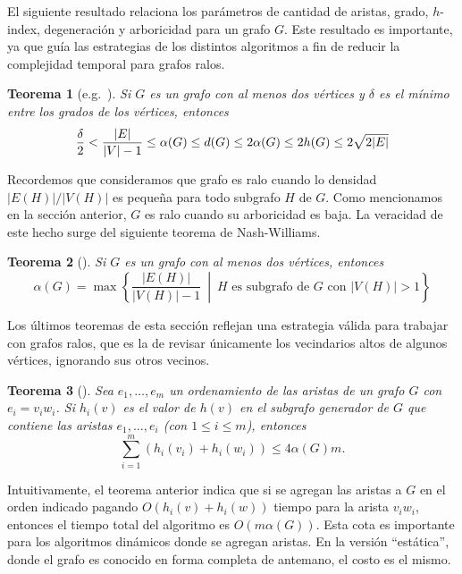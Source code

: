 \documentclass[%
    a4paper,%
    fontsize=12pt,%
    DIV=12,
    twoside,%
    openright,%
    titlepage=true,%
    headsepline,%
    toc=bibliography,%
    parskip=half,%
    cleardoublepage=empty,%
    headings=big,%
]{scrbook}
\newtheorem{theorem}{Teorema}
\begin{document}
El siguiente resultado relaciona los parámetros de cantidad de aristas, grado, $h$-index, degeneración y arboricidad para un grafo $G$.  Este resultado es importante, ya que guía las estrategias de los distintos algoritmos a fin de reducir la complejidad temporal para grafos ralos.

\begin{theorem}[e.g.~\cite{ChibaNishizekiSJC1985,LinSoulignacSzwarcfiterTCS2012}]
 Si $G$ es un grafo con al menos dos vértices y $\delta$ es el mínimo entre los grados de los vértices, entonces
 \begin{displaymath}
   \frac{\delta}{2} < \frac{|E|}{|V|-1} \leq \alpha(G) \leq d(G) \leq 2\alpha(G) \leq 2h(G) \leq 2\sqrt{2|E|} \\
 \end{displaymath}
\end{theorem}

Recordemos que consideramos que grafo es ralo cuando lo densidad $|E(H)|/|V(H)|$ es pequeña para todo subgrafo $H$ de $G$.  Como mencionamos en la sección anterior, $G$ es ralo cuando su arboricidad es baja.  La veracidad de este hecho surge del siguiente teorema de Nash-Williams.

\begin{theorem}[\cite{Nash-WilliamsJLMS1964}]
  Si $G$ es un grafo con al menos dos vértices, entonces
  \[\alpha(G) = \max\left\{\frac{|E(H)|}{|V(H)|-1} \ \middle| \ H \text{ es subgrafo de }G \text{ con } |V(H)| > 1\right\}\]
\end{theorem}

Los últimos teoremas de esta sección reflejan una estrategia válida para trabajar con grafos ralos, que es la de revisar únicamente los vecindarios altos de algunos vértices, ignorando sus otros vecinos.

\begin{theorem}[\cite{LinSoulignacSzwarcfiterTCS2012}]
 Sea $e_1, \ldots, e_m$ un ordenamiento de las aristas de un grafo $G$ con $e_i = v_iw_i$.  Si $h_i(v)$ es el valor de $h(v)$ en el subgrafo generador de $G$ que contiene las aristas $e_1, \ldots, e_i$ (con $1 \leq i \leq m$), entonces
 \[\displaystyle \sum_{i=1}^{m}(h_i(v_i)+h_i(w_i)) \leq 4\alpha(G)m.\]
\end{theorem}

Intuitivamente, el teorema anterior indica que si se agregan las aristas a $G$ en el orden indicado pagando $O(h_i(v)+h_i(w))$ tiempo para la arista $v_iw_i$, entonces el tiempo total del algoritmo es $O(m\alpha(G))$.  Esta cota es importante para los algoritmos dinámicos donde se agregan aristas.  En la versión ``estática'', donde el grafo es conocido en forma completa de antemano, el costo es el mismo.
\end{document}
